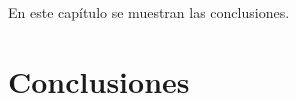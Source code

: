 \documentclass[../main/main.tex]{subfiles}
\begin{document}
\espacio

  En este capítulo se muestran las conclusiones.

  \section{Conclusiones}
\end{document}
